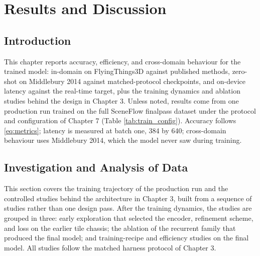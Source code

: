 \chapter{Results and Discussion}

\section{Introduction}
This chapter reports accuracy, efficiency, and cross-domain behaviour
for the trained model: in-domain on FlyingThings3D against published
methods, zero-shot on Middlebury 2014 against matched-protocol
checkpoints, and on-device latency against the real-time target, plus
the training dynamics and ablation studies behind the design in
Chapter 3. Unless noted, results come from one production run trained
on the full SceneFlow finalpass dataset under the protocol and
configuration of Chapter 7 (Table \ref{tab:train_config}). Accuracy
follows \eqref{eq:metrics}; latency is measured at batch one, 384 by
640; cross-domain behaviour uses Middlebury 2014, which the model
never saw during training.

\FloatBarrier
\section{Investigation and Analysis of Data}
This section covers the training trajectory of the production run and
the controlled studies behind the architecture in Chapter 3, built
from a sequence of studies rather than one design pass. After the
training dynamics, the studies are grouped in three: early exploration
that selected the encoder, refinement scheme, and loss on the earlier
tile chassis; the ablation of the recurrent family that produced the
final model; and training-recipe and efficiency studies on the final
model. All studies follow the matched harness protocol of Chapter 3.


